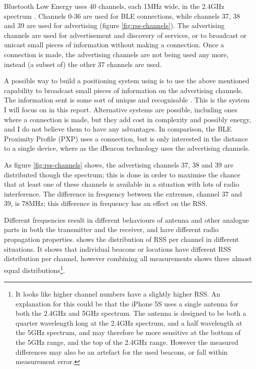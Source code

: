 Bluetooth Low Energy uses 40 channels, each 1MHz wide, in the 2.4GHz spectrum \citep{bluetooth40spec}.
Channels 0-36 are used for BLE connections, while channels 37, 38 and 39 are used for advertising (figure \ref{fig:rss-channels}).
The advertising channels are used for advertisement and discovery of services, or to broadcast or unicast small pieces of information without making a connection.
Once a connection is made, the advertising channels are not being used any more, instead (a subset of) the other 37 channels are used.

A possible way to build a positioning system using \BLE is to use the above mentioned capability to broadcast small pieces of information on the advertising channels.
The information sent is some sort of unique and recognisable \bid.
This is the system I will focus on in this report.
Alternative systems are possible, including ones where a connection is made, but they add cost in complexity and possibly energy, and I do not believe them to have any advantages.
In comparison, the BLE Proximity Profile (PXP) uses a connection, but is only interested in the distance to a single device, where as the iBeacon technology uses the advertising channels.

As figure \ref{fig:rss-channels} shows, the advertising channels 37, 38 and 39 are distributed though the spectrum; this is done in order to maximise the chance that at least one of these channels is available in a situation with lots of radio interference.
The difference in frequency between the extremes, channel 37 and 39, is 78MHz; this difference in frequency has an effect on the RSS.

Different frequencies result in different behaviours of antenna and other analogue parts in both the transmitter and the receiver, and have different radio propagation properties.
 shows the distribution of RSS per channel in different situations.
It shows that individual beacons or locations have different RSS distribution per channel, however combining all measurements shows three almost equal distributions\footnote{It looks like higher channel numbers have a slightly higher RSS.
    An explanation for this could be that the iPhone 5S uses a single antenna for both the 2.4GHz and 5GHz spectrum.
    The antenna is designed to be both a quarter wavelength long at the 2.4GHz spectrum, and a half wavelength at the 5GHz spectrum, and may therefore be more sensitive at the bottom of the 5GHz range, and the top of the 2.4GHz range.
    However the measured differences may also be an artefact for the used beacons, or fall within measurement error.
}.

